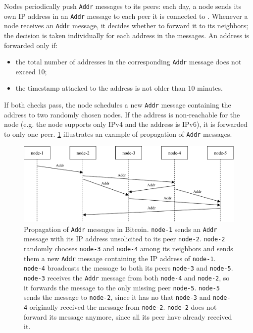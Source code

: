\medskip
Nodes periodically push \texttt{Addr} messages to its peers:
each day, a node sends its own IP address in an \texttt{Addr} message to each peer it is connected to \cite{eclipse_attack_2015}.
Whenever a node receives an \texttt{Addr} message, it decides whether to forward it to its neighbors;
the decision is taken individually for each address in the messages.
An address is forwarded only if:
\begin{itemize}
	\item the total number of addresses in the corresponding \texttt{Addr} message does not exceed \num{10};
	\item the timestamp attacked to the address is not older than \num{10} minutes.
\end{itemize}
If both checks pass, the node schedules a new \texttt{Addr} message containing the address to two randomly chosen nodes.
If the address is non-reachable for the node (e.g. the node supports only IPv4 and the address is IPv6), it is forwarded to only one peer.
\cref{fig:addr_propagation} illustrates an example of propagation of \texttt{Addr} messages.

\begin{figure}[ht]
	\centering
	\vspace*{0.4cm}
	\includegraphics[scale=1.04]{figures/addr_propagation}
	\vspace*{0.25cm}
	\caption[Propagation of Addr messages in Bitcoin]{
		Propagation of \texttt{Addr} messages in Bitcoin.
		\texttt{node-1} sends an \texttt{Addr} message with its IP address unsolicited to its peer \texttt{node-2}.
		\texttt{node-2} randomly chooses \texttt{node-3} and \texttt{node-4} among its neighbors and sends them a new \texttt{Addr} message containing the IP address of \texttt{node-1}.
		\texttt{node-4} broadcasts the message to both its peers \texttt{node-3} and \texttt{node-5}.
		\texttt{node-3} receives the \texttt{Addr} message from both \texttt{node-4} and \texttt{node-2}, so it forwards the message to the only missing peer \texttt{node-5}.
		\texttt{node-5} sends the message to \texttt{node-2}, since it has no that \texttt{node-3} and \texttt{node-4} originally received the message from \texttt{node-2}.
		\texttt{node-2} does not forward its message anymore, since all its peer have already received it.
	}
	\label{fig:addr_propagation}
\end{figure}

